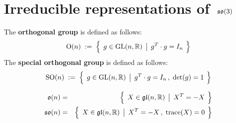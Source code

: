 

\section{Irreducible representations of \,$\mathfrak{so}(3)$}
\setcounter{theorem}{0}
\setcounter{equation}{0}


\renewcommand{\theenumi}{\roman{enumi}}
\renewcommand{\labelenumi}{\textnormal{(\theenumi)}$\;\;$}


\vskip 0.3cm
\begin{definition}
\mbox{}
\vskip 0.1cm
\noindent
The \textbf{orthogonal group} is defined as follows:
\begin{equation*}
\textnormal{O}(n)
\; := \;
	\left\{\;\,
		g \overset{{\color{white}.}}{\in} \textnormal{GL}(n,\Re)
		\;\left\vert\;\,
			g^{T} \cdot g = I_{n}
			\right.
		\;\right\}
\end{equation*}
The \textbf{special orthogonal group} is defined as follows:
\begin{equation*}
\textnormal{SO}(n)
\; := \;
	\left\{\;\,
		g \overset{{\color{white}.}}{\in} \textnormal{GL}(n,\Re)
		\;\left\vert\;\,
			g^{T} \cdot g = I_{n}\,,
			\;
			\textnormal{det}(g) = 1
			\right.
		\;\right\}
\end{equation*}
\end{definition}

\vskip 0.5cm
\begin{proposition}
\begin{eqnarray*}
\mathfrak{o}(n)
& = &
	\left\{\;\,
		X \overset{{\color{white}.}}{\in} \mathfrak{gl}(n,\Re)
		\;\left\vert\;\,
			X^{T} = -X
			\right.
		\;\right\}
\\
\mathfrak{so}(n)
& = &
	\left\{\;\,
		X \overset{{\color{white}.}}{\in} \mathfrak{gl}(n,\Re)
		\;\left\vert\;\,
			X^{T} = -X\,,
			\;
			\textnormal{trace}(X) = 0
			\right.
		\;\right\}
\end{eqnarray*}
\end{proposition}


